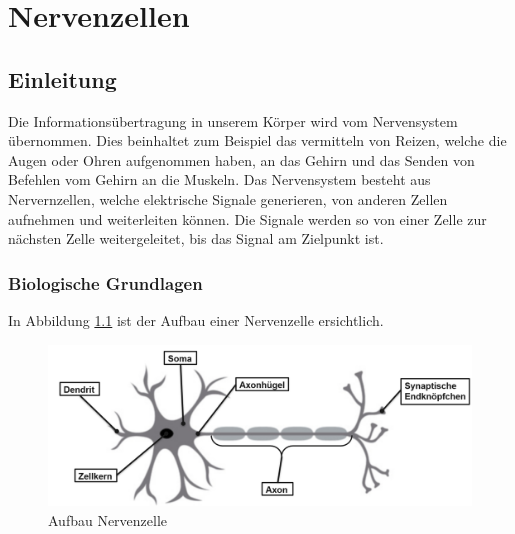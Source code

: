 %
%
%
%
\chapter{Nervenzellen\label{chapter:nerven}}
\begin{refsection}
\section{Einleitung}


Die Informationsübertragung in unserem Körper wird vom Nervensystem übernommen.
Dies beinhaltet zum Beispiel das vermitteln von Reizen, welche die Augen oder Ohren aufgenommen haben,
an das Gehirn und das Senden von Befehlen vom Gehirn an die Muskeln.
Das Nervensystem besteht aus Nervernzellen, welche elektrische Signale generieren, von anderen Zellen aufnehmen und weiterleiten können.
Die Signale werden so von einer Zelle zur nächsten Zelle weitergeleitet, bis das Signal am Zielpunkt ist.
\subsection{Biologische Grundlagen}
In Abbildung \ref{fig:Aufbau Nervenzelle} ist der Aufbau einer Nervenzelle ersichtlich. 
\begin{figure}[H]
    \centering
    \includegraphics[width=\textwidth]{papers/nerven/Bilder/NervenAufbau2.png}
    \caption{Aufbau Nervenzelle}
    \label{fig:Aufbau Nervenzelle}
\end{figure}


\end{refsection}
